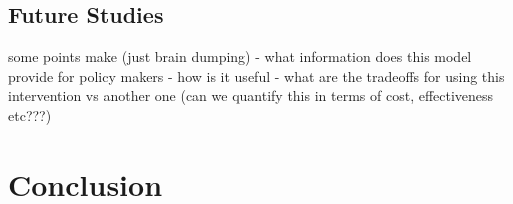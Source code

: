 \documentclass[12pt, centerh1]{article}
\begin{document}
\subsection{Future Studies}



some points  make (just brain dumping)
- what information does this model provide for policy makers
- how is it useful
- what are the tradeoffs for using this intervention vs another one (can we quantify this in terms of cost, effectiveness etc???)



\section{Conclusion}



\newpage

\end{document}
